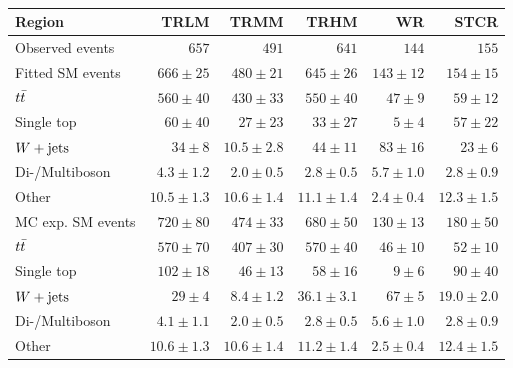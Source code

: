 

\begin{table}
\begin{center}
{\small
\begin{tabular}{lrrrrr}
\toprule
Region           & TRLM            & TRMM            & TRHM            & WR            & STCR              \\[-0.05cm]
\midrule
Observed events          & $657$              & $491$              & $641$              & $144$              & $155$                    \\
\midrule
Fitted SM events         & $666 \pm 25$          & $480 \pm 21$          & $645 \pm 26$          & $143 \pm 12$          & $154 \pm 15$              \\
\noalign{\smallskip}\hline\noalign{\smallskip}
        $t\bar{t}$         & $560 \pm 40$          & $430 \pm 33$          & $550 \pm 40$          & $47 \pm 9$          & $59 \pm 12$              \\
        Single top         & $60 \pm 40$          & $27 \pm 23$          & $33 \pm 27$          & $5 \pm 4$          & $57 \pm 22$              \\
        $W+\mathrm{jets}$         & $34 \pm 8$          & $10.5 \pm 2.8$          & $44 \pm 11$          & $83 \pm 16$          & $23 \pm 6$              \\
        Di-/Multiboson        & $4.3 \pm 1.2$          & $2.0 \pm 0.5$          & $2.8 \pm 0.5$          & $5.7 \pm 1.0$          & $2.8 \pm 0.9$              \\
        Other       & $10.5 \pm 1.3$          & $10.6 \pm 1.4$          & $11.1 \pm 1.4$          & $2.4 \pm 0.4$          & $12.3 \pm 1.5$              \\
\toprule
MC exp. SM events              & $720 \pm 80$          & $474 \pm 33$          & $680 \pm 50$          & $130 \pm 13$          & $180 \pm 50$              \\
\midrule
        $t\bar{t}$        & $570 \pm 70$          & $407 \pm 30$          & $570 \pm 40$          & $46 \pm 10$          & $52 \pm 10$              \\
        Single top         & $102 \pm 18$          & $46 \pm 13$          & $58 \pm 16$          & $9 \pm 6$          & $90 \pm 40$              \\
        $W+\mathrm{jets}$         & $29 \pm 4$          & $8.4 \pm 1.2$          & $36.1 \pm 3.1$          & $67 \pm 5$          & $19.0 \pm 2.0$              \\
        Di-/Multiboson         & $4.1 \pm 1.1$          & $2.0 \pm 0.5$          & $2.8 \pm 0.5$          & $5.6 \pm 1.0$          & $2.8 \pm 0.9$              \\
       Other        & $10.6 \pm 1.3$          & $10.6 \pm 1.4$          & $11.2 \pm 1.4$          & $2.5 \pm 0.4$          & $12.4 \pm 1.5$              \\
\bottomrule\end{tabular}
}
\end{center}
\caption{}
\label{tab:results_bkg_only_CR}
\end{table}
%